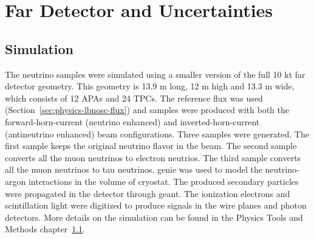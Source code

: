 \section{Far Detector and Uncertainties}
\label{sec:physics-lbnosc-FD}


\subsection{Simulation}
The neutrino samples were simulated using a smaller version of the full 10 kt far detector geometry. This geometry is 13.9 m long, 12 m high and 13.3 m wide, which consists of 12 APAs and 24 TPCs. The reference flux was used (Section~\ref{sec:physics-lbnosc-flux}) and samples were produced with both the forward-horn-current (neutrino enhanced) and inverted-horn-current (antineutrino enhanced) beam configurations. Three samples were generated. The first sample keeps the original neutrino flavor in the beam. The second sample converts all the muon neutrinos to electron neutrios. The third sample converts all the muon neutrinos to tau neutrinos. {\sc genie}  was used to model the neutrino-argon interactions in the volume of cryostat. The produced secondary particles were propagated in the detector through {\sc geant}. The ionization electrons and scintillation light were digitized to produce signals in the wire planes and photon detectors. More details on the simulation can be found in the Physics Tools and Methods chapter~\ref{}.

